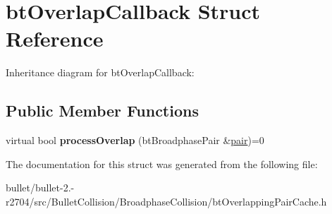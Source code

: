 \hypertarget{structbt_overlap_callback}{\section{bt\+Overlap\+Callback Struct Reference}
\label{structbt_overlap_callback}
}


Inheritance diagram for bt\+Overlap\+Callback\+:
\subsection*{Public Member Functions}
\begin{DoxyCompactItemize}
\item 
\hypertarget{structbt_overlap_callback_a43c2553686960e509a62cd8957da492f}{virtual bool {\bfseries process\+Overlap} (bt\+Broadphase\+Pair \&\hyperlink{structpair}{pair})=0}\label{structbt_overlap_callback_a43c2553686960e509a62cd8957da492f}

\end{DoxyCompactItemize}


The documentation for this struct was generated from the following file\+:\begin{DoxyCompactItemize}
\item 
bullet/bullet-\/2.-\/r2704/src/\+Bullet\+Collision/\+Broadphase\+Collision/bt\+Overlapping\+Pair\+Cache.\+h\end{DoxyCompactItemize}
